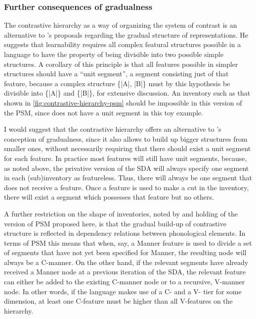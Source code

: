 \subsubsection{Further consequences of gradualness}
\label{sec:furth-cons-grad}

The contrastive hierarchy as a way of organizing the system of contrast is an alternative to \citeauthor{moren-psm}'s \citeyearpar{moren-psm,moren-serbian,moren-foa} proposals regarding the gradual structure of representations. He suggests that learnability requires all complex featural structures possible in a language to have the property of being divisible into two possible simple structures. A corollary of this principle is that all features possible in simpler structures should have a \enquote{unit segment}, \ie a segment consisting just of that feature, because a complex structure \{|A|, |B|\} must by this hypothesis be divisible into \{|A|\} and \{|B|\}, \cf \citet{blaho-diss} for extensive discussion. An inventory such as that shown in \cref{fig:contrastive-hierarchy-psm} should be impossible in this version of the PSM, since  does not have a unit segment in this toy example.

I would suggest that the contrastive hierarchy offers an alternative to \citeauthor{moren-psm}'s conception of gradualness, since it also allows to build up bigger structures from smaller ones, without necessarily requiring that there should exist a unit segment for each feature. In practice most features will still have unit segments, because, as noted above, the privative version of the SDA will always specify one segment in each (sub)inventory as featureless. Thus, there will always be one segment that does not receive a feature. Once a feature is used to make a cut in the inventory, there will exist a segment which possesses that feature but no others.

A further restriction on the shape of inventories, noted by \citet{blaho-diss} and holding of the version of PSM proposed here, is that the gradual build-up of contrastive structure is reflected in dependency relations between phonological elements. In terms of PSM this means that when, say, a Manner feature is used to divide a set of segments that have not yet been specified for Manner, the resulting node will always be a C-manner. On the other hand, if the relevant segments have already received a Manner node at a previous iteration of the SDA, the relevant feature can either be added to the existing C-manner node or to a recursive, \ie V-manner node. In other words, if the language makes use of a C- and a V- tier for some dimension, at least one C-feature must be higher than all V-features on the hierarchy.

